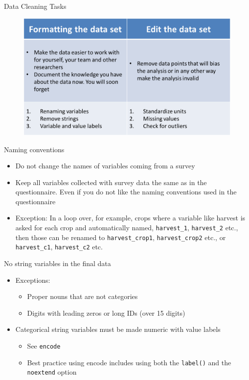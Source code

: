 \documentclass[aspectratio=169]{beamer}
\begin{document}
\begin{frame}{Data Cleaning Tasks}
	\begin{figure}
		\centering
		\includegraphics[width=.9\linewidth]{img/formatting}
	\end{figure}
\end{frame}

\begin{frame}{Naming conventions}
	\begin{itemize}
		\item Do not change the names of variables coming from a survey
		\item Keep all variables collected with survey data the same as in the questionnaire. Even if you do not like the naming conventions used in the questionnaire
		\item Exception: In a loop over, for example, crops where a variable like harvest is asked for each crop and automatically named, \texttt{harvest\_1}, \texttt{harvest\_2} etc., then those can be renamed to \texttt{harvest\_crop1}, \texttt{harvest\_crop2} etc., or \texttt{harvest\_c1}, \texttt{harvest\_c2} etc.
	\end{itemize}
\end{frame}

\begin{frame}{No string variables in the final data }
	\begin{itemize}
		\item Exceptions:
		\begin{itemize}
			\item Proper nouns that are not categories
			\item Digits with leading zeros or long IDs (over 15 digits)
		\end{itemize}
		\item Categorical string variables must be made numeric with value labels
		\begin{itemize}
			\item See \texttt{encode}
			\item Best practice using encode includes using both the \texttt{label()} and the \texttt{noextend} option
		\end{itemize}
	\end{itemize}
\end{frame}
\end{document}
